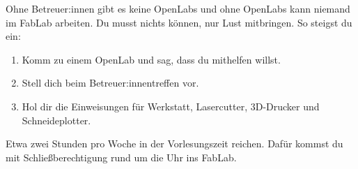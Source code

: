 Ohne Betreuer:innen gibt es keine OpenLabs und ohne OpenLabs kann
niemand im FabLab arbeiten. Du musst nichts können, nur Lust
mitbringen. So steigst du ein:
\begin{enumerate}
  \item Komm zu einem OpenLab und sag, dass du mithelfen willst.
  \item Stell dich beim Betreuer:innen\-treffen vor.
  \item Hol dir die Einweisungen für Werkstatt, Lasercutter,
    3D-Drucker und Schneideplotter.
\end{enumerate}
\vspace{8mm}
Etwa zwei Stunden pro Woche in der Vorlesungszeit reichen. Dafür
kommst du mit Schließberechtigung rund um die Uhr ins FabLab.
